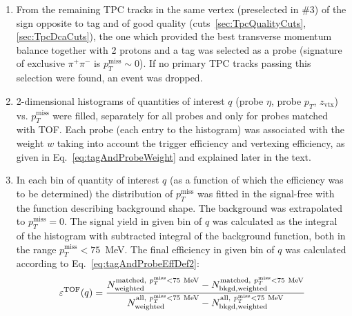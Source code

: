 \begin{enumerate}
 \item From the remaining TPC tracks in the same vertex (preselected in \#3) of the sign opposite to tag and of good quality (cuts~\ref{sec:TpcQualityCuts},\ref{sec:TpcDcaCuts}), the one which provided the best transverse momentum balance together with 2 protons and a tag was selected as a probe (signature of exclusive $\pi^{+}\pi^{-}$ is  $p_{T}^{\text{miss}}\sim0$). If no primary TPC tracks passing this selection were found, an event was dropped.\\[-16pt]%
 \item 2-dimensional histograms of quantities of interest $q$ (probe $\eta$, probe $p_{T}$, $z_{\text{vtx}}$) vs. $p_{T}^{\text{miss}}$ were filled, separately for all probes and only for probes matched with TOF. Each probe (each entry to the histogram) was associated with the weight $w$ taking into account the trigger efficiency and vertexing efficiency, as given in Eq.~\eqref{eq:tagAndProbeWeight} and explained later in the text.\\[-16pt]%
 \item In each bin of quantity of interest $q$ (as a function of which the efficiency was to be determined) the distribution of $p_{T}^{\text{miss}}$ was fitted  in the signal-free with the function describing background shape. The background was extrapolated to $p_{T}^{\text{miss}}=0$. The signal yield in given bin of $q$ was calculated as the integral of the histogram with subtracted integral of the background function, both in the range $p_{T}^{\text{miss}}<75$~MeV. The final efficiency in given bin of $q$ was calculated according to Eq.~\eqref{eq:tagAndProbeEffDef2}:
 \begin{equation}\label{eq:tagAndProbeEffDef2}
  \varepsilon^{\text{TOF}}(q) = \frac{N_\text{weighted}^{\text{matched},~p_{T}^{\text{miss}}<75~\text{MeV}} - N_\text{bkgd,weighted}^{\text{matched},~p_{T}^{\text{miss}}<75~\text{MeV}} }{ N_\text{weighted}^{\text{all},~p_{T}^{\text{miss}}<75~\text{MeV}} - N_\text{bkgd,weighted}^{\text{all},~p_{T}^{\text{miss}}<75~\text{MeV}} }\vspace*{-25pt}
 \end{equation}
\end{enumerate}
%
%
%
%
%
%
%
